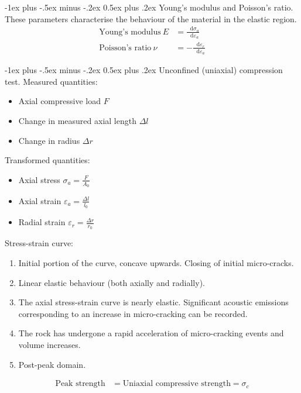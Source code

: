 \documentclass[10pt,landscape,a4paper]{article}
\makeatletter
\renewcommand\d{\mathop{}\!\mathrm{d}}
\renewcommand{\section}{\@startsection{section}{1}{0mm}%
	{-1ex plus -.5ex minus -.2ex}%
	{0.5ex plus .2ex}%
	{\normalfont\large\bfseries}}
\makeatother
\begin{document}
\begin{multicols}{3}
	\section{Young's modulus and Poisson's ratio.}
	These parameters characterise the behaviour of the material in the elastic region.
	\begin{align*}
		\text{Young's modulus} \ E   & =\frac{\d\sigma_a}{\d\varepsilon_a}       \\
		\text{Poisson's ratio} \ \nu & =-\frac{\d\varepsilon_r}{\d\varepsilon_a}
	\end{align*}
	
	\section{Unconfined (uniaxial) compression test.}
	Measured quantities:
	\begin{itemize}
		\item Axial compressive load $F$
		\item Change in measured axial length $\Delta l$
		\item Change in radius $\Delta r$
	\end{itemize}
	Transformed quantities:
	\begin{itemize}
		\item Axial stress $\sigma_a=\frac{F}{A_0}$
		\item Axial strain $\varepsilon_a=\frac{\Delta l}{l_0}$
		\item Radial strain $\varepsilon_r=\frac{\Delta r}{r_0}$
	\end{itemize}
	Stress-strain curve:
	\begin{enumerate}[label=\Roman*.]
		\item Initial portion of the curve, concave upwards. Closing of initial micro-cracks.
		\item Linear elastic behaviour (both axially and radially).
		\item The axial stress-strain curve is nearly elastic. Significant acoustic emissions corresponding to an increase in micro-cracking can be recorded.
		\item The rock has undergone a rapid acceleration of micro-cracking events and volume increases.
		\item Post-peak domain.
	\end{enumerate}
	\begin{align*}
		\text{Peak strength} & = \text{Uniaxial compressive strength} = \sigma_c          \\

\end{align*}
\end{multicols}
\end{document}
